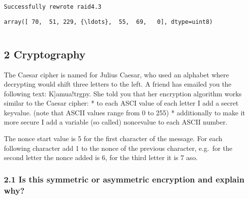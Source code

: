 \documentclass[11pt]{article}
\makeatletter
\newcommand{\boxspacing}{\kern\kvtcb@left@rule\kern\kvtcb@boxsep}
\newcommand{\prompt}[4]{
        {\ttfamily\llap{{\color{#2}[#3]:\hspace{3pt}#4}}\vspace{-\baselineskip}}
    }
\makeatother
\begin{document}
    \begin{Verbatim}[commandchars=\\\{\}]
Successfully rewrote raid4.3
    \end{Verbatim}

            \begin{tcolorbox}[breakable, size=fbox, boxrule=.5pt, pad at break*=1mm, opacityfill=0]
\prompt{Out}{outcolor}{10}{\boxspacing}
\begin{Verbatim}[commandchars=\\\{\}]
array([ 70,  51, 229, {\ldots},  55,  69,   0], dtype=uint8)
\end{Verbatim}
\end{tcolorbox}
        
    \begin{tcolorbox}[breakable, size=fbox, boxrule=1pt, pad at break*=1mm,colback=cellbackground, colframe=cellborder]
\prompt{In}{incolor}{ }{\boxspacing}
\begin{Verbatim}[commandchars=\\\{\}]

\end{Verbatim}
\end{tcolorbox}

    \hypertarget{cryptography}{%
\subsection{2 Cryptography}\label{cryptography}}

The Caesar cipher is named for Julius Caesar, who used an alphabet where
decrypting would shift three letters to the left. A friend has emailed
you the following text: K{]}amua!trgpy. She told you that her encryption
algorithm works similar to the Caesar cipher: * to each ASCI value of
each letter I add a secret keyvalue. (note that ASCII values range from
0 to 255) * additionally to make it more secure I add a variable (so
called) noncevalue to each ASCII number.

The nonce start value is 5 for the first character of the message. For
each following character add 1 to the nonce of the previous character,
e.g.~for the second letter the nonce added is 6, for the third letter it
is 7 aso.

    \hypertarget{is-this-symmetric-or-asymmetric-encryption-and-explain-why}{%
\subsubsection{2.1 Is this symmetric or asymmetric encryption and
explain
why?}\label{is-this-symmetric-or-asymmetric-encryption-and-explain-why}}
\end{document}
